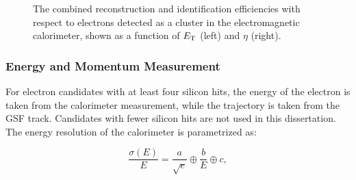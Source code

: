 \begin{figure}[htbp]
{		
	}
	\caption{The combined reconstruction and identification efficiencies with respect to electrons detected as a cluster in the electromagnetic calorimeter, shown as a function of $E_{\mathrm{T}}$ (left) and $\eta$ (right).}
	\label{fig:electron-id-efficiencies}
\end{figure}


\subsubsection{Energy and Momentum Measurement}\label{sec:reco-electron-energymomentum}
For electron candidates with at least four silicon hits, the energy of the electron is taken from the calorimeter measurement, while the trajectory is taken from the GSF track. Candidates with fewer silicon hits are not used in this dissertation. The energy resolution of the calorimeter is parametrized as:

\begin{equation}
	\frac{\sigma(E)}{E} = \frac{a}{\sqrt{e}} \oplus \frac{b}{E} \oplus c,
\end{equation}

